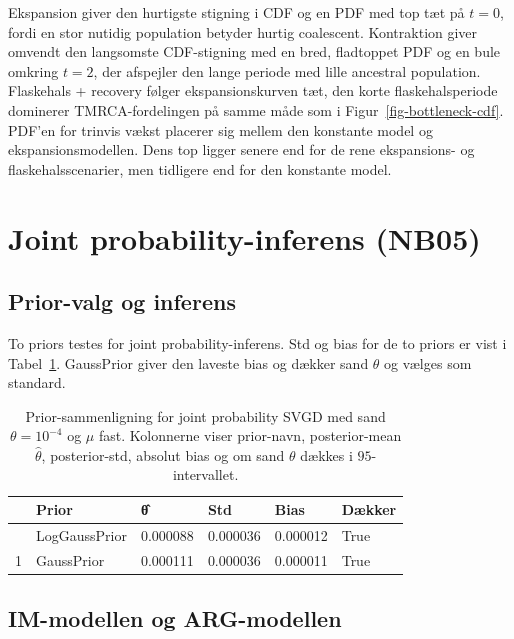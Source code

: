 \documentclass[
  10pt,
  a4paper,
]{scrbook}
\begin{document}
Ekspansion giver den hurtigste stigning i CDF og en PDF med top tæt på
\(t=0\), fordi en stor nutidig population betyder hurtig coalescent.
Kontraktion giver omvendt den langsomste CDF-stigning med en bred,
fladtoppet PDF og en bule omkring \(t=2\), der afspejler den lange
periode med lille ancestral population. Flaskehals + recovery følger
ekspansionskurven tæt, den korte flaskehalsperiode dominerer
TMRCA-fordelingen på samme måde som i Figur~\ref{fig-bottleneck-cdf}.
PDF'en for trinvis vækst placerer sig mellem den konstante model og
ekspansionsmodellen. Dens top ligger senere end for de rene ekspansions-
og flaskehalsscenarier, men tidligere end for den konstante model.

\section{Joint probability-inferens
(NB05)}\label{joint-probability-inferens-nb05}

\subsection{Prior-valg og inferens}\label{prior-valg-og-inferens}

To priors testes for joint probability-inferens. Std og bias for de to
priors er vist i Tabel~\ref{tbl-prior-joint}. GaussPrior giver den
laveste bias og dækker sand \(\theta\) og vælges som standard.

{

\begin{longtable}[]{@{}llllll@{}}

\caption{\label{tbl-prior-joint}Prior-sammenligning for joint
probability SVGD med sand \(\theta=10^{-4}\) og \(\mu\) fast. Kolonnerne
viser prior-navn, posterior-mean \(\hat{\theta}\), posterior-std,
absolut bias og om sand \(\theta\) dækkes i \(95%
\)-intervallet.}

\tabularnewline

\toprule\noalign{}
& Prior & θ̂ & Std & Bias & Dækker \\
\midrule\noalign{}
\endhead
\bottomrule\noalign{}
\endlastfoot
0 & LogGaussPrior & 0.000088 & 0.000036 & 0.000012 & True \\
1 & GaussPrior & 0.000111 & 0.000036 & 0.000011 & True \\

\end{longtable}

}

\subsection{IM-modellen og
ARG-modellen}\label{im-modellen-og-arg-modellen}
\end{document}
